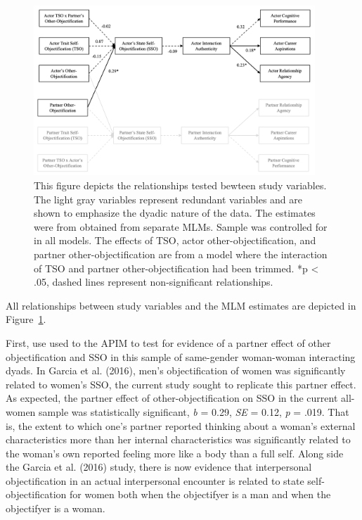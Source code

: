 \documentclass[man]{apa6}
\begin{document}
\begin{figure}
\includegraphics[width=400px]{figures/SEMfigure} \caption{This figure depicts the relationships tested bewteen study variables. The light gray variables represent redundant variables and are shown to emphasize the dyadic nature of the data. The estimates were from obtained from separate MLMs. Sample was controlled for in all models. The effects of TSO, actor other-objectification, and partner other-objectification are from a model where the interaction of TSO and partner other-objectification had been trimmed. *p < .05, dashed lines represent non-significant relationships.}\label{fig:semfigure}
\end{figure}

All relationships between study variables and the MLM estimates are
depicted in Figure~\ref{fig:semfigure}.

First, use used to the APIM to test for evidence of a partner effect of
other objectification and SSO in this sample of same-gender woman-woman
interacting dyads. In Garcia et al. (2016), men's objectification of
women was significantly related to women's SSO, the current study sought
to replicate this partner effect. As expected, the partner effect of
other-objectification on SSO in the current all-women sample was
statistically significant, \emph{b} = 0.29, \emph{SE} = 0.12, \emph{p} =
.019. That is, the extent to which one's partner reported thinking about
a woman's external characteristics more than her internal
characteristics was significantly related to the woman's own reported
feeling more like a body than a full self. Along side the Garcia et al.
(2016) study, there is now evidence that interpersonal objectification
in an actual interpersonal encounter is related to state
self-objectification for women both when the objectifyer is a man and
when the objectifyer is a woman.
\end{document}

